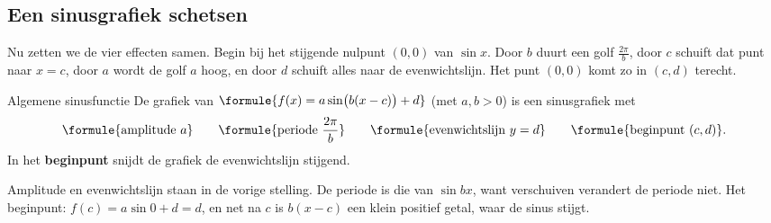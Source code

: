 \begin{oefeningen}
\end{oefeningen}

\subsection{Een sinusgrafiek schetsen}

Nu zetten we de vier effecten samen. Begin bij het stijgende nulpunt $(0, 0)$ van $\sin x$. Door $b$ duurt een golf $\frac{2\pi}{b}$, door $c$ schuift dat punt naar $x = c$, door $a$ wordt de golf $a$ hoog, en door $d$ schuift alles naar de evenwichtslijn. Het punt $(0, 0)$ komt zo in $(c, d)$ terecht.

\begin{theorie}
\begin{stelling}{Algemene sinusfunctie}
De grafiek van $\formule{f(x) = a\sin\bigl(b(x - c)\bigr) + d}$ (met $a, b > 0$) is een sinusgrafiek met
\[\formule{\text{amplitude } a} \qquad \formule{\text{periode } \frac{2\pi}{b}} \qquad \formule{\text{evenwichtslijn } y = d} \qquad \formule{\text{beginpunt } (c, d)}.\]
In het \textbf{\textcolor{accent}{beginpunt}} snijdt de grafiek de evenwichtslijn stijgend.
\end{stelling}
\begin{bewijs}
Amplitude en evenwichtslijn staan in de vorige stelling. De periode is die van $\sin bx$, want verschuiven verandert de periode niet. Het beginpunt: $f(c) = a\sin 0 + d = d$, en net na $c$ is $b(x - c)$ een klein positief getal, waar de sinus stijgt.
\end{bewijs}
\end{theorie}

